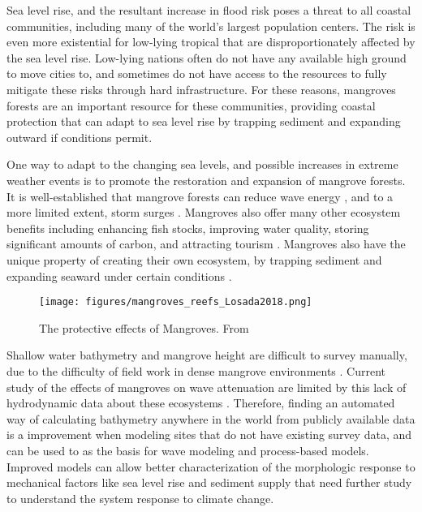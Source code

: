Sea level rise, and the resultant increase in flood risk poses a threat to all coastal communities, including many of the world's largest population centers. The risk is even more existential for low-lying tropical that are disproportionately affected by the sea level rise. Low-lying nations often do not have any available high ground to move cities to, and sometimes do not have access to the resources to fully mitigate these risks through hard infrastructure. For these reasons, mangroves forests are an important resource for these communities, providing coastal protection that can adapt to sea level rise by trapping sediment and expanding outward if conditions permit.

One way to adapt to the changing sea levels, and possible increases in extreme weather events is to promote the restoration and expansion of mangrove forests. It is well-established that mangrove forests can reduce wave energy \parencite{Maza2019,Menendez2020,Hadi2003,Sanchez-Nunez2020}, and to a more limited extent, storm surges \parencite{Montgomery2019a,Chen2021,Mcivor2012}. Mangroves also offer many other ecosystem benefits including enhancing fish stocks, improving water quality, storing significant amounts of carbon, and attracting tourism \parencite{Atkinson2016b}. Mangroves also have the unique property of creating their own ecosystem, by trapping sediment and expanding seaward under certain conditions \cite{Gijsman2021}.

\begin{figure}[htbp]
      \centering
      \texttt{[image: figures/mangroves\_reefs\_Losada2018.png]}
      \caption{The protective effects of Mangroves. From \parencite{Losada2018}}
      \label{mangrove-protection-diagram}
\end{figure}

Shallow water bathymetry and mangrove height are difficult to survey manually, due to the difficulty of field work in dense mangrove environments \parencite{Gijsman2021}. Current study of the effects of mangroves on wave attenuation are limited by this lack of hydrodynamic data about these ecosystems \parencite{Horstman2014}.  Therefore, finding an automated way of calculating bathymetry anywhere in the world from publicly available data is a improvement when modeling sites that do not have existing survey data, and can be used to as the basis for wave modeling and process-based models. Improved models can allow better characterization of the morphologic response to mechanical factors like sea level rise and sediment supply that need further study to understand the system response to climate change.

